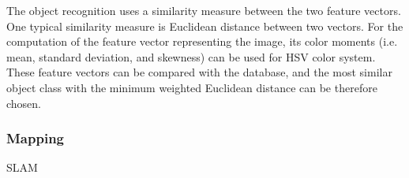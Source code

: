 The object recognition uses a similarity measure between the two feature vectors. One typical similarity measure is Euclidean distance between two vectors. For the computation of the feature vector representing the image, its color moments (i.e. mean, standard deviation, and skewness) can be used for HSV color system. These feature vectors can be compared with the database, and the most similar object class with the minimum weighted Euclidean distance can be therefore chosen.
\subsubsection{Mapping} SLAM

